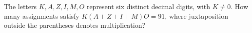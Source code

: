 The letters $K,A,Z,I,M,O$ represent six distinct decimal digits, with $K\ne0$. How many assignments satisfy $K(A+Z+I+M)O=91$, where juxtaposition outside the parentheses denotes multiplication?
